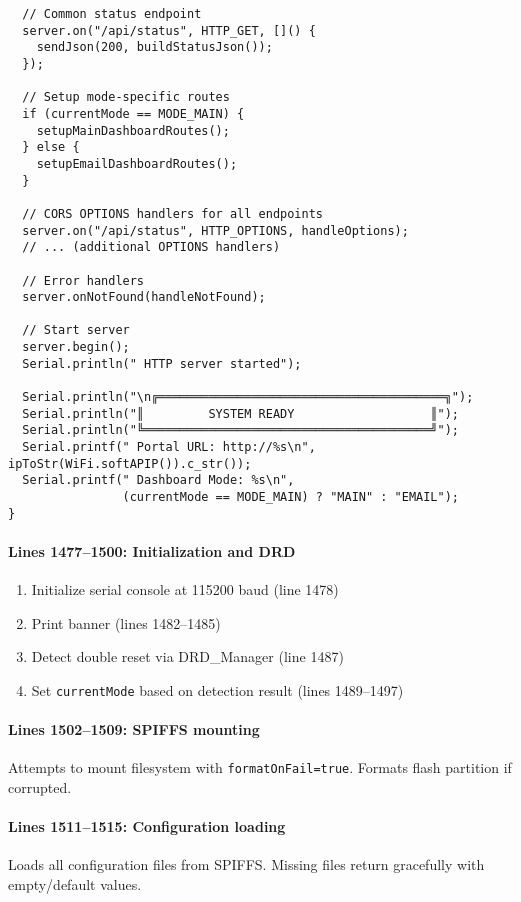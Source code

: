 \documentclass[11pt,a4paper]{article}
\begin{document}
\begin{verbatim}
  // Common status endpoint
  server.on("/api/status", HTTP_GET, []() { 
    sendJson(200, buildStatusJson()); 
  });
  
  // Setup mode-specific routes
  if (currentMode == MODE_MAIN) {
    setupMainDashboardRoutes();
  } else {
    setupEmailDashboardRoutes();
  }
  
  // CORS OPTIONS handlers for all endpoints
  server.on("/api/status", HTTP_OPTIONS, handleOptions);
  // ... (additional OPTIONS handlers)
  
  // Error handlers
  server.onNotFound(handleNotFound);
  
  // Start server
  server.begin();
  Serial.println(" HTTP server started");
  
  Serial.println("\n╔════════════════════════════════════════╗");
  Serial.println("║         SYSTEM READY                   ║");
  Serial.println("╚════════════════════════════════════════╝");
  Serial.printf(" Portal URL: http://%s\n", ipToStr(WiFi.softAPIP()).c_str());
  Serial.printf(" Dashboard Mode: %s\n", 
                (currentMode == MODE_MAIN) ? "MAIN" : "EMAIL");
}
\end{verbatim}

\paragraph{Lines 1477--1500: Initialization and DRD}
\begin{enumerate}[leftmargin=*]
  \item Initialize serial console at 115200 baud (line 1478)
  \item Print banner (lines 1482--1485)
  \item Detect double reset via DRD\_Manager (line 1487)
  \item Set \texttt{currentMode} based on detection result (lines 1489--1497)
\end{enumerate}

\paragraph{Lines 1502--1509: SPIFFS mounting}
Attempts to mount filesystem with \texttt{formatOnFail=true}. Formats flash partition if corrupted.

\paragraph{Lines 1511--1515: Configuration loading}
Loads all configuration files from SPIFFS. Missing files return gracefully with empty/default values.
\end{document}
